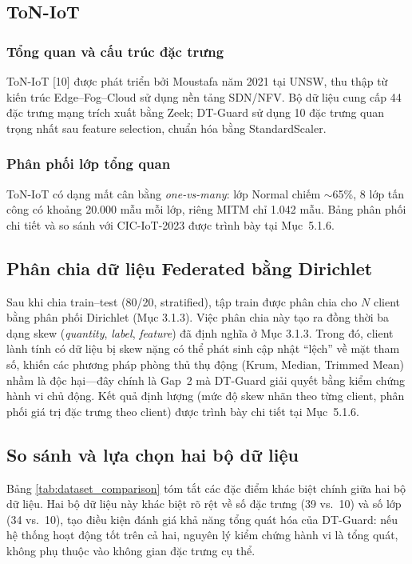 \subsection{ToN-IoT}

\subsubsection{Tổng quan và cấu trúc đặc trưng}
ToN-IoT {[}10{]} được phát triển bởi Moustafa năm 2021 tại UNSW, thu thập từ kiến trúc Edge--Fog--Cloud sử dụng nền tảng SDN/NFV. Bộ dữ liệu cung cấp 44 đặc trưng mạng trích xuất bằng Zeek; DT-Guard sử dụng 10 đặc trưng quan trọng nhất sau feature selection, chuẩn hóa bằng StandardScaler.

\subsubsection{Phân phối lớp tổng quan}
ToN-IoT có dạng mất cân bằng \textit{one-vs-many}: lớp Normal chiếm $\sim$65\%, 8 lớp tấn công có khoảng 20.000 mẫu mỗi lớp, riêng MITM chỉ 1.042 mẫu. Bảng phân phối chi tiết và so sánh với CIC-IoT-2023 được trình bày tại Mục~5.1.6.

\subsection{Phân chia dữ liệu Federated bằng Dirichlet}
\label{sec:dirichlet_split}

Sau khi chia train--test (80/20, stratified), tập train được phân chia cho $N$ client bằng phân phối Dirichlet (Mục 3.1.3). Việc phân chia này tạo ra đồng thời ba dạng skew (\textit{quantity}, \textit{label}, \textit{feature}) đã định nghĩa ở Mục 3.1.3. Trong đó, client lành tính có dữ liệu bị skew nặng có thể phát sinh cập nhật ``lệch'' về mặt tham số, khiến các phương pháp phòng thủ thụ động (Krum, Median, Trimmed Mean) nhầm là độc hại---đây chính là Gap~2 mà DT-Guard giải quyết bằng kiểm chứng hành vi chủ động. Kết quả định lượng (mức độ skew nhãn theo từng client, phân phối giá trị đặc trưng theo client) được trình bày chi tiết tại Mục~5.1.6.

\subsection{So sánh và lựa chọn hai bộ dữ liệu}
Bảng \ref{tab:dataset_comparison} tóm tắt các đặc điểm khác biệt chính giữa hai bộ dữ liệu. Hai bộ dữ liệu này khác biệt rõ rệt về số đặc trưng (39 vs.\ 10) và số lớp (34 vs.\ 10), tạo điều kiện đánh giá khả năng tổng quát hóa của DT-Guard: nếu hệ thống hoạt động tốt trên cả hai, nguyên lý kiểm chứng hành vi là tổng quát, không phụ thuộc vào không gian đặc trưng cụ thể.

